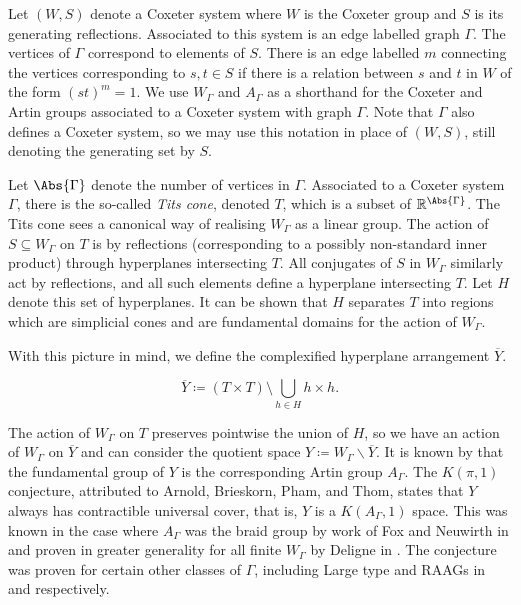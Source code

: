 Let $(W,S)$ denote a Coxeter system where $W$ is the Coxeter group and $S$ is its generating reflections.
Associated to this system is an edge labelled graph $\Gamma$.
The vertices of  $\Gamma$ correspond to elements of  $S$.
There is an edge labelled $m$ connecting the vertices corresponding to $s,t\in S$ if there is a relation between $s$ and  $t$ in  $W$ of the form  $(st)^m=1$.
We use $W_\Gamma$ and  $A_\Gamma$  as a shorthand for the Coxeter and Artin groups associated to a Coxeter system with graph $\Gamma$.
Note that $\Gamma$ also defines a Coxeter system, so we may use this notation in place of $(W,S)$, still denoting the generating set by $S$.

Let $\Abs{\Gamma}$ denote the number of vertices in $\Gamma$.
Associated to a Coxeter system $\Gamma$, there is the so-called \emph{Tits cone}, denoted $T$, which is a subset of $\R^{\Abs{\Gamma}}$.
The Tits cone sees a canonical way of realising $W_\Gamma$ as a linear group.
The action of $S \subseteq W_\Gamma$ on  $T$ is by reflections (corresponding to a possibly non-standard inner product) through hyperplanes intersecting $T$.
All conjugates of $S$ in $W_\Gamma$ similarly act by reflections, and all such elements define a hyperplane intersecting $T$.
Let $H$ denote this set of hyperplanes.
It can be shown that $H$ separates  $T$ into regions which are simplicial cones and are fundamental domains for the action of  $W_\Gamma$.

With this picture in mind, we define the complexified hyperplane arrangement $\overline{Y}$.

\[
	\overline{Y} \coloneq \left(T \times T\right) \setminus \bigcup_{h \in H} h \times h
	.\]

The action of $W_\Gamma$ on $T$ preserves pointwise the union of $H$, so we have an action of $W_\Gamma$ on $\overline{Y}$ and can consider the quotient space  $Y \coloneq W_\Gamma \backslash \overline{Y}$.
It is known by \cite{lek_homotopy_1983} that the fundamental group of $Y$ is the corresponding Artin group  $A_\Gamma$.
The $K(\pi,1)$ conjecture, attributed to Arnold, Brieskorn, Pham, and Thom, states that $Y$ always has contractible universal cover, that is, $Y$ is a $K(A_\Gamma,1)$ space.
This was known in the case where $A_\Gamma$ was the braid group by work of Fox and Neuwirth in \cite{fox_neuwirth_braid_1962} and proven in greater generality for all finite $W_\Gamma$ by Deligne in \cite{deligne_immeubles_1972}.
The conjecture was proven for certain other classes of $\Gamma$, including Large type and RAAGs in \cite{hendriks_hyperplane_1985} and \cite{charney_davis_finite_2016} respectively.

